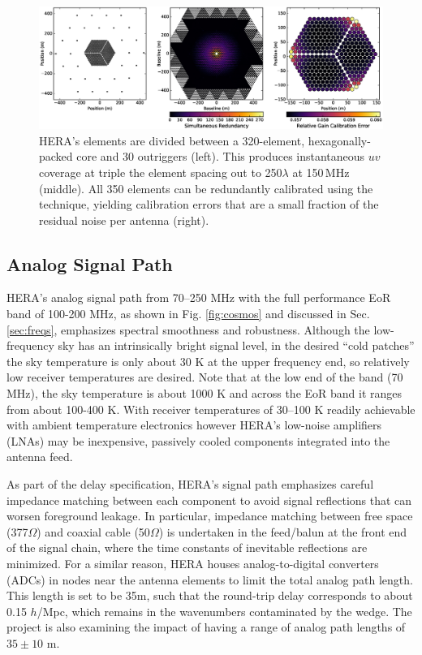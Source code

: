 \documentclass[preprint,11pt]{aastex}
\begin{document}
\begin{figure}[h]
	\centering
	\vspace{-5pt}
	\includegraphics[width=1\textwidth,clip]{plots/HERA_Array_Config.eps}
	\vspace{-25pt}
	\caption{HERA's elements are divided between a 320-element, hexagonally-packed core and 30 outriggers (left). This produces instantaneous
$uv$ coverage at triple the element spacing out to 250$\lambda$ at 150\,MHz (middle). All 350 elements can be redundantly calibrated 
using the \citet{liu_et_al2010} technique, yielding calibration errors that are a small fraction of the residual noise per antenna (right).}
		\label{fig:arrayConfig}
			\vspace{-10pt}
\end{figure}

\subsection{Analog Signal Path}
HERA's analog signal path from 70--250 MHz with the full performance EoR band of 100-200 MHz, as shown in Fig. \ref{fig:cosmos} and discussed in Sec. \ref{sec:freqs}, emphasizes spectral smoothness and robustness.  Although the low-frequency sky has an intrinsically bright signal level, in the desired ``cold patches'' the sky temperature is only about 30 K at the upper frequency end, so relatively low receiver temperatures are desired.  Note that at the low end of the band (70 MHz), the sky temperature is about 1000 K and across the EoR band it ranges from about 100-400 K.
With receiver temperatures of 30--100 K readily achievable with ambient temperature electronics however
HERA's low-noise amplifiers (LNAs) may be inexpensive, passively cooled components integrated into the
antenna feed.  

As part of the delay specification,
HERA's signal path emphasizes careful impedance matching between each component to avoid signal reflections that can worsen foreground leakage.
In particular, impedance matching between free space (377$\Omega$) and coaxial cable (50$\Omega$) is undertaken
in the feed/balun at the front end of the signal chain, where the time constants of inevitable reflections are
minimized.  For a similar reason, HERA houses analog-to-digital converters (ADCs) in nodes near the antenna elements
to limit the total analog path length.  This length is set to be 35m, such that the round-trip delay corresponds to about 0.15 $h$/Mpc, which remains in the wavenumbers  contaminated by the wedge.  The project is also examining the impact of having a range of analog path lengths of $35\pm10$ m.
\end{document}
